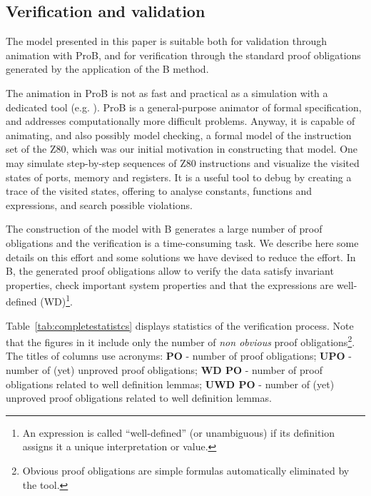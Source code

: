 \documentclass[a4paper]{llncs}
\begin{document}

\subsection{Verification and validation}%

The model presented in this paper is suitable both for validation
through animation with ProB, and for verification through the standard
proof obligations generated by the application of the B method. 

The animation in ProB is not as fast and practical as a simulation
with a dedicated tool (e.g. \cite{Simulator_z80}). ProB is a
general-purpose animator of formal specification, and addresses
computationally more difficult problems. Anyway, it is capable of
animating, and also possibly model checking, a formal model of the
instruction set of the Z80, which was our initial motivation in
constructing that model. One may simulate step-by-step sequences of
Z80 instructions and visualize the visited states of ports, memory and
registers. It is a useful tool to debug by creating a trace of the
visited states, offering to analyse constants, functions and
expressions, and search possible violations.


The construction of the model with B generates a large number of proof
obligations and the verification is a time-consuming task. We describe
here some details on this effort and some solutions we have devised to
reduce the effort.  In B, the generated proof obligations allow to
verify the data satisfy invariant properties, check important system
properties and that the expressions are well-defined (WD)\footnote{An
  expression is called ``well-defined'' (or unambiguous) if its
  definition assigns it a unique interpretation or value.}. 

Table~\ref{tab:completestatistcs} displays statistics of the
verification process. Note that the figures in it include only the
number of \emph{non obvious} proof obligations\footnote{Obvious proof
  obligations are simple formulas automatically eliminated by the
  tool.}. The titles of columns use acronyms: {\small \textbf{PO}} -
number of proof obligations; {\small \textbf{UPO}} - number of (yet)
unproved proof obligations; {\small \textbf{WD PO}} - number of proof
obligations related to well definition lemmas; {\small \textbf{UWD
    PO}} - number of (yet) unproved proof obligations related to well
definition lemmas.
 
\end{document}
